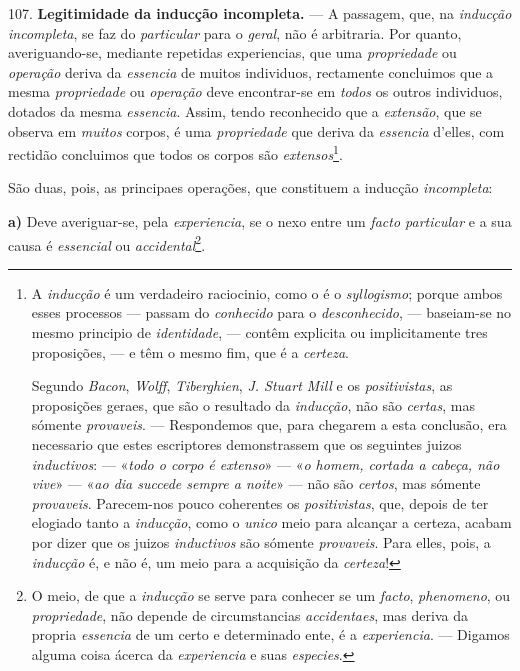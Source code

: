 107. \textbf{Legitimidade da inducção incompleta.} --- A passagem,   que, na \emph{inducção incompleta}, se faz do \emph{particular} para o \emph{geral}, não é arbitraria. Por quanto, averiguando-se, mediante repetidas experiencias, que uma \emph{propriedade} ou \emph{operação} deriva da \emph{essencia} de muitos individuos, rectamente concluimos que a mesma \emph{propriedade} ou \emph{operação} deve encontrar-se em \emph{todos} os outros individuos, dotados da mesma \emph{essencia}. Assim, tendo reconhecido que a \emph{extensão}, que se observa em \emph{muitos} corpos, é uma \emph{propriedade} que deriva da \emph{essencia} d'elles, com rectidão concluimos que todos os corpos são \emph{extensos}\footnote{A \emph{inducção} é um verdadeiro raciocinio, como o é o \emph{syllogismo}; porque ambos esses processos --- passam do \emph{conhecido} para o \emph{desconhecido}, --- baseiam-se no mesmo principio de \emph{identidade}, --- contêm explicita ou implicitamente tres proposições, --- e têm o mesmo fim, que é a \emph{certeza}.\par Segundo \emph{Bacon}, \emph{Wolff}, \emph{Tiberghien}, \emph{J. Stuart Mill} e os \emph{positivistas}, as proposições geraes, que são o resultado da \emph{inducção}, não são \emph{certas}, mas sómente \emph{provaveis}. --- Respondemos que, para chegarem a esta conclusão, era necessario que estes escriptores demonstrassem que os seguintes juizos \emph{inductivos}: --- «\emph{todo o corpo é extenso}» --- «\emph{o homem, cortada a cabeça, não vive}» --- «\emph{ao dia succede sempre a noite}» --- não são \emph{certos}, mas sómente \emph{provaveis}. Parecem-nos pouco coherentes os \emph{positivistas}, que, depois de ter elogiado tanto a \emph{inducção}, como o \emph{unico} meio para alcançar a certeza, acabam por dizer que os juizos \emph{inductivos} são sómente \emph{provaveis}. Para elles, pois, a \emph{inducção} é, e não é, um meio para a acquisição da \emph{certeza}!}.


São duas, pois, as principaes operações, que constituem a inducção \emph{incompleta}:

\textbf{a)} Deve averiguar-se, pela \emph{experiencia}, se o nexo entre um \emph{facto particular} e a sua causa é \emph{essencial} ou \emph{accidental}\footnote{O meio, de que a \emph{inducção} se serve para conhecer se um \emph{facto}, \emph{phenomeno}, ou \emph{propriedade}, não depende de circumstancias \emph{accidentaes}, mas deriva da propria \emph{essencia} de um certo e determinado ente, é a \emph{experiencia}. --- Digamos alguma coisa ácerca da \emph{experiencia} e suas \emph{especies}.}.

